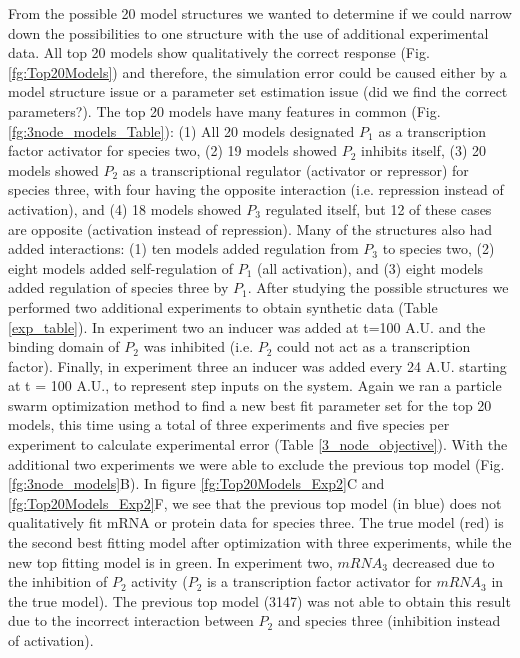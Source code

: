 \documentclass[12pt]{article}
\begin{document}
From the possible 20 model structures we wanted to determine if we could narrow down the possibilities to one structure with the use of additional experimental data. 
All top 20 models show qualitatively the correct response (Fig. \ref{fg:Top20Models}) and therefore, the simulation error could be caused either by a model structure issue or a parameter set estimation issue (did we find the correct parameters?). 
The top 20 models have many features in common (Fig. \ref{fg:3node_models_Table}): (1) All 20 models designated $P_{1}$ as a transcription factor activator for species two, (2) 19 models showed $P_{2}$ inhibits itself, (3) 20 models showed $P_{2}$ as a transcriptional regulator (activator or repressor) for species three, with four having the opposite interaction (i.e. repression instead of activation), and (4) 18 models showed $P_{3}$ regulated itself, but 12 of these cases are opposite (activation instead of repression).
Many of the structures also had added interactions: (1) ten models added regulation from $P_{3}$ to species two, (2) eight models added self-regulation of $P_{1}$ (all activation), and (3) eight models added regulation of species three by $P_{1}$.
After studying the possible structures we performed two additional experiments to obtain synthetic data (Table \ref{exp_table}). 
In experiment two an inducer was added at t=100 A.U. and the binding domain of $P_{2}$ was inhibited (i.e. $P_{2}$ could not act as a transcription factor). 
Finally, in experiment three an inducer was added every 24 A.U. starting at t = 100 A.U., to represent step inputs on the system. 
Again we ran a particle swarm optimization method to find a new best fit parameter set for the top 20 models, this time using a total of three experiments and five species per experiment to calculate experimental error (Table \ref{3_node_objective}).
With the additional two experiments we were able to exclude the previous top model (Fig. \ref{fg:3node_models}B).
In figure \ref{fg:Top20Models_Exp2}C and \ref{fg:Top20Models_Exp2}F, we see that the previous top model (in blue) does not qualitatively fit mRNA or protein data for species three. 
The true model (red) is the second best fitting model after optimization with three experiments, while the new top fitting model is in green.   
In experiment two, $mRNA_{3}$ decreased due to the inhibition of $P_{2}$ activity ($P_{2}$ is a transcription factor activator for $mRNA_{3}$ in the true model). 
The previous top model (3147) was not able to obtain this result due to the incorrect interaction between $P_{2}$ and species three (inhibition instead of activation). 
\end{document}
